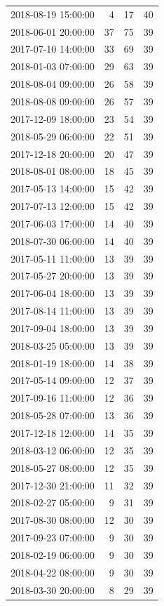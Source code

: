\begin{tabular}{lrrr}
2018-08-19 15:00:00 & 4 & 17 & 40 \\
2018-06-01 20:00:00 & 37 & 75 & 39 \\
2017-07-10 14:00:00 & 33 & 69 & 39 \\
2018-01-03 07:00:00 & 29 & 63 & 39 \\
2018-08-04 09:00:00 & 26 & 58 & 39 \\
2018-08-08 09:00:00 & 26 & 57 & 39 \\
2017-12-09 18:00:00 & 23 & 54 & 39 \\
2018-05-29 06:00:00 & 22 & 51 & 39 \\
2017-12-18 20:00:00 & 20 & 47 & 39 \\
2018-08-01 08:00:00 & 18 & 45 & 39 \\
2017-05-13 14:00:00 & 15 & 42 & 39 \\
2017-07-13 12:00:00 & 15 & 42 & 39 \\
2017-06-03 17:00:00 & 14 & 40 & 39 \\
2018-07-30 06:00:00 & 14 & 40 & 39 \\
2017-05-11 11:00:00 & 13 & 39 & 39 \\
2017-05-27 20:00:00 & 13 & 39 & 39 \\
2017-06-04 18:00:00 & 13 & 39 & 39 \\
2017-08-14 11:00:00 & 13 & 39 & 39 \\
2017-09-04 18:00:00 & 13 & 39 & 39 \\
2018-03-25 05:00:00 & 13 & 39 & 39 \\
2018-01-19 18:00:00 & 14 & 38 & 39 \\
2017-05-14 09:00:00 & 12 & 37 & 39 \\
2017-09-16 11:00:00 & 12 & 36 & 39 \\
2018-05-28 07:00:00 & 13 & 36 & 39 \\
2017-12-18 12:00:00 & 14 & 35 & 39 \\
2018-03-12 06:00:00 & 12 & 35 & 39 \\
2018-05-27 08:00:00 & 12 & 35 & 39 \\
2017-12-30 21:00:00 & 11 & 32 & 39 \\
2018-02-27 05:00:00 & 9 & 31 & 39 \\
2017-08-30 08:00:00 & 12 & 30 & 39 \\
2017-09-23 07:00:00 & 9 & 30 & 39 \\
2018-02-19 06:00:00 & 9 & 30 & 39 \\
2018-04-22 08:00:00 & 9 & 30 & 39 \\
2018-03-30 20:00:00 & 8 & 29 & 39 \\

\end{tabular}
